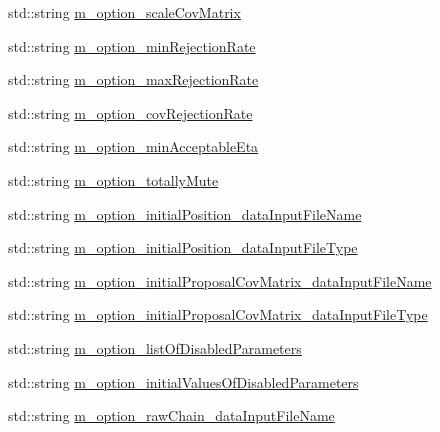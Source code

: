 \begin{DoxyCompactItemize}
\item 
std\-::string \hyperlink{class_q_u_e_s_o_1_1_m_l_sampling_level_options_aa1f82f5b58286f8b2565d80cc33dec4f}{m\-\_\-option\-\_\-scale\-Cov\-Matrix}
\item 
std\-::string \hyperlink{class_q_u_e_s_o_1_1_m_l_sampling_level_options_a384a262aeb20ef3ff57e9dd4697b464e}{m\-\_\-option\-\_\-min\-Rejection\-Rate}
\item 
std\-::string \hyperlink{class_q_u_e_s_o_1_1_m_l_sampling_level_options_ae226db9c741e8d6652f30c81cde61899}{m\-\_\-option\-\_\-max\-Rejection\-Rate}
\item 
std\-::string \hyperlink{class_q_u_e_s_o_1_1_m_l_sampling_level_options_a3a8c05911fea3a80ff8efe3e046ba5e9}{m\-\_\-option\-\_\-cov\-Rejection\-Rate}
\item 
std\-::string \hyperlink{class_q_u_e_s_o_1_1_m_l_sampling_level_options_a3af49d715cf211ed67e5206bc0d1840d}{m\-\_\-option\-\_\-min\-Acceptable\-Eta}
\item 
std\-::string \hyperlink{class_q_u_e_s_o_1_1_m_l_sampling_level_options_a303f13a4f8fe1fb586ada0b95c0c2f8c}{m\-\_\-option\-\_\-totally\-Mute}
\item 
std\-::string \hyperlink{class_q_u_e_s_o_1_1_m_l_sampling_level_options_a08ae170166172f72b1b98e523ce0d71c}{m\-\_\-option\-\_\-initial\-Position\-\_\-data\-Input\-File\-Name}
\item 
std\-::string \hyperlink{class_q_u_e_s_o_1_1_m_l_sampling_level_options_a562837ca20c890940f09e7ea90b5aaf4}{m\-\_\-option\-\_\-initial\-Position\-\_\-data\-Input\-File\-Type}
\item 
std\-::string \hyperlink{class_q_u_e_s_o_1_1_m_l_sampling_level_options_ada1645363cc30723d66b6c8237425ec3}{m\-\_\-option\-\_\-initial\-Proposal\-Cov\-Matrix\-\_\-data\-Input\-File\-Name}
\item 
std\-::string \hyperlink{class_q_u_e_s_o_1_1_m_l_sampling_level_options_a75a15f2c496d82ce310669fb9de753c5}{m\-\_\-option\-\_\-initial\-Proposal\-Cov\-Matrix\-\_\-data\-Input\-File\-Type}
\item 
std\-::string \hyperlink{class_q_u_e_s_o_1_1_m_l_sampling_level_options_a296043cd6f00282ccf1a39e219aa16ef}{m\-\_\-option\-\_\-list\-Of\-Disabled\-Parameters}
\item 
std\-::string \hyperlink{class_q_u_e_s_o_1_1_m_l_sampling_level_options_ab96236f77ecc1033bcdecbddced0c60f}{m\-\_\-option\-\_\-initial\-Values\-Of\-Disabled\-Parameters}
\item 
std\-::string \hyperlink{class_q_u_e_s_o_1_1_m_l_sampling_level_options_a58eff69f727ad1128029a0d6fc98e556}{m\-\_\-option\-\_\-raw\-Chain\-\_\-data\-Input\-File\-Name}

\end{DoxyCompactItemize}
